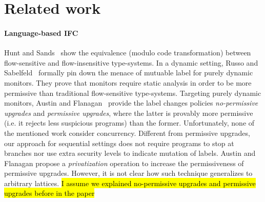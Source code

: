 \section{Related work}

\paragraph{Language-based IFC}
Hunt and Sands~\citep{Hunt:2006} show the equivalence (modulo code
transformation) between flow-sensitive and flow-insensitive type-systems. In a
dynamic setting, Russo and Sabelfeld~\citep{Russo:2010} formally pin down the
menace of mutuable label for purely dynamic monitors. They prove that monitors
require static analysis in order to be more permissive than traditional
flow-sensitive type-systems. Targeting purely dynamic monitors, Austin and
Flanagan~\citep{Austin:Flanagan:PLAS10} provide the label changes policies
\emph{no-permissive upgrades} and \emph{permissive upgrades}, where the latter
is provably more permissive (i.e. it rejects less suspicious programs) than the
former. Unfortunately, none of the mentioned work consider
concurrency. Different from permissive upgrades, our approach for sequential
settings does not require programs to stop at branches nor use extra security
levels to indicate mutation of labels. Austin and Flanagan propose a
\emph{privatization} operation to increase the permissiveness of permissive
upgrades. However, it is not clear how such technique generalizes to arbitrary
lattices.
\hl{I assume we explained no-permissive upgrades and permissive upgrades 
before in the paper}



